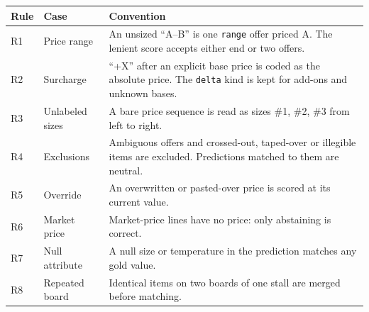 \begin{tabular}{@{}llp{9.0cm}@{}}
\toprule
Rule & Case & Convention \\
\midrule
R1 & Price range & An unsized ``A--B'' is one \texttt{range} offer priced A. The lenient score accepts either end or two offers. \\
R2 & Surcharge & ``+X'' after an explicit base price is coded as the absolute price. The \texttt{delta} kind is kept for add-ons and unknown bases. \\
R3 & Unlabeled sizes & A bare price sequence is read as sizes \#1, \#2, \#3 from left to right. \\
R4 & Exclusions & Ambiguous offers and crossed-out, taped-over or illegible items are excluded. Predictions matched to them are neutral. \\
R5 & Override & An overwritten or pasted-over price is scored at its current value. \\
R6 & Market price & Market-price lines have no price: only abstaining is correct. \\
R7 & Null attribute & A null size or temperature in the prediction matches any gold value. \\
R8 & Repeated board & Identical items on two boards of one stall are merged before matching. \\
\bottomrule
\end{tabular}
